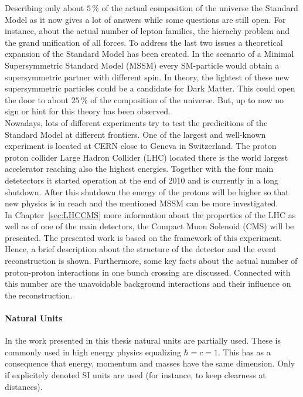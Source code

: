 Describing only about $5\,\%$ of the actual composition of the universe the Standard Model as it now gives a lot of answers while some questions are still open. For instance, about the actual number of lepton families, the hierachy problem and the grand unification of all forces. To address the last two issues a theoretical expansion of the Standard Model has been created. In the scenario of a Minimal Supersymmetric Standard Model (MSSM) every SM-particle would obtain a supersymmetric partner with different spin. In theory, the lightest of these new supersymmetric particles could be a candidate for Dark Matter. This could open the door to about $25\,\%$ of the composition of the universe. But, up to now no sign or hint for this theory has been observed. \\

Nowadays, lots of different experiments try to test the predicitions of the Standard Model at different frontiers. One of the largest and well-known experiment is located at CERN  close to Geneva in Switzerland. The proton proton collider Large Hadron Collider (LHC) located there is the world largest accelerator reaching also the highest energies. Together with the four main detetectors it started operation at the end of 2010 and is currently in a long shutdown. After this shutdown the energy of the protons will be higher so that new physics is in reach and the mentioned MSSM can be more investigated. \\

In Chapter~\ref{sec:LHCCMS} more information about the properties of the LHC as well as of one of the main detectors, the Compact Muon Solenoid (CMS) will be presented. The presented work is based on the framework of this experiment. Hence, a brief description about the structure of the detector and the event reconstruction is shown. Furthermore, some key facts about the actual number of proton-proton interactions in one bunch crossing are discussed. Connected with this number are the unavoidable background interactions and their influence on the reconstruction.

\paragraph*{Natural Units}

In the work presented in this thesis natural units are partially used. These is commonly used in high energy physics equalizing $\hbar{} = c = 1$. This has as a consequence that energy, momentum and masses have the same dimension. Only if explicitely denoted SI units are used (for instance, to keep clearness at distances).
